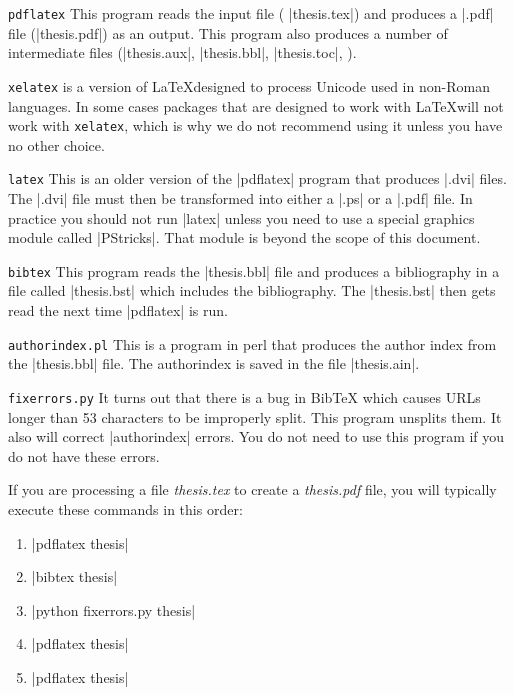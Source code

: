 \begin{description}
\item{\texttt{pdflatex}} This program reads the input file (\eg
  |thesis.tex|) and produces a |.pdf| file (\eg |thesis.pdf|)
  as an output. This program also produces a number of intermediate
  files (|thesis.aux|, |thesis.bbl|, |thesis.toc|,
  \etc).
\item{\texttt{xelatex}} is a version of \LaTeX designed to process
  Unicode used in non-Roman languages. In some cases packages that are
  designed to work with \LaTeX will not work with \texttt{xelatex},
  which is why we do not recommend using it unless you have no other choice.
\item{\texttt{latex}} This is an older version of the |pdflatex|
  program that produces |.dvi| files. The |.dvi| file must then be
  transformed into either a |.ps| or a |.pdf| file. In practice you
  should not run |latex| unless you need to use a special graphics
  module called |PStricks|. That module is beyond the scope of this document.
\item{\texttt{bibtex}} This program reads the |thesis.bbl| file and
  produces a bibliography in a file called |thesis.bst| which
  includes the bibliography. The |thesis.bst| then gets read the
  next time |pdflatex| is run.
\item{\texttt{authorindex.pl}} This is a program in perl that produces the
  author index from the |thesis.bbl| file. The authorindex is
  saved in the file |thesis.ain|.
\item{\texttt{fixerrors.py}} It turns out that there is a bug in Bib\TeX{}
  which causes URLs longer than 53 characters to be improperly
  split. This program unsplits them. It also will correct |authorindex| errors.  You do not need to use this
  program if you do not have these errors.
\end{description}

If you are processing a file \emph{thesis.tex} to create a
\emph{thesis.pdf} file, you will typically execute these commands in
this order:

\begin{enumerate}
\item |pdflatex thesis|
\item |bibtex thesis|
\item |python fixerrors.py thesis|
\item |pdflatex thesis|
\item |pdflatex thesis|
\end{enumerate}

